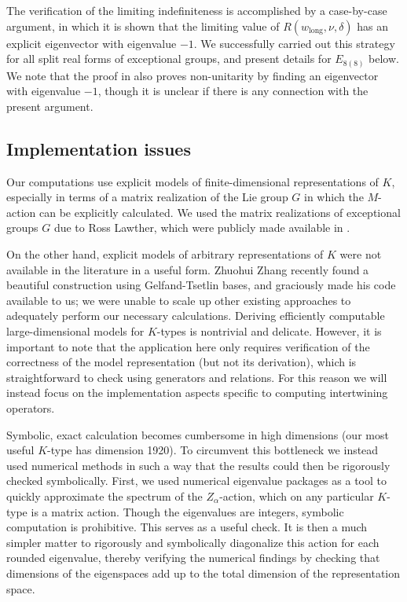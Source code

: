 \documentclass[12pt]{article}
\numberwithin{equation}{section}
\renewcommand\({\left(}
\renewcommand\){\right)}
\begin{document}
The verification of the limiting indefiniteness is accomplished by a case-by-case argument, in which it is shown that the limiting value of $R(w_\text{long},\nu,\delta)$ has an explicit eigenvector with eigenvalue $-1$.  We successfully carried out this strategy for all split real forms of exceptional groups, and  present details for $E_{8(8)}$ below.  We note that the proof in \cite{DM-B} also proves non-unitarity by finding an eigenvector with eigenvalue $-1$, though it is unclear if there is  any connection with the present argument.


\subsection{Implementation issues}

Our computations use explicit models of finite-dimensional representations of $K$, especially in terms of a matrix realization of the Lie group $G$ in which the $M$-action can be explicitly calculated.  We used the matrix realizations of exceptional groups $G$ due to Ross Lawther, which were publicly made available in \cite{Hundley-Miller}.

On the other hand, explicit models of arbitrary  representations of $K$  were not available in the literature in a useful form.   Zhuohui Zhang recently found
a beautiful construction using Gelfand-Tsetlin bases, and graciously made his code \cite{Zhangrepo} available to us;  we were unable to scale up other existing approaches to adequately perform our necessary calculations.
  Deriving efficiently computable large-dimensional models for $K$-types is nontrivial and delicate.  However, it is important to note that the application here only requires verification of the correctness of the model representation (but not its derivation), which is straightforward to check using generators and relations.
For this reason we will instead focus on the implementation aspects specific to computing intertwining operators.


Symbolic, exact calculation becomes cumbersome in high dimensions (our most useful $K$-type has dimension 1920).  To circumvent this bottleneck we instead used numerical methods in such a way that the results could then be rigorously checked symbolically.
  First, we used numerical eigenvalue packages as a tool to quickly approximate the spectrum of the $Z_\alpha$-action, which on any particular $K$-type is a matrix action.  Though the eigenvalues are integers, symbolic computation is prohibitive.  This serves as a useful check.  It is then a much simpler matter to rigorously and symbolically diagonalize  this action for each rounded eigenvalue, thereby verifying the numerical findings by checking that  dimensions of the eigenspaces add up to the total dimension of the representation space.
\end{document}
